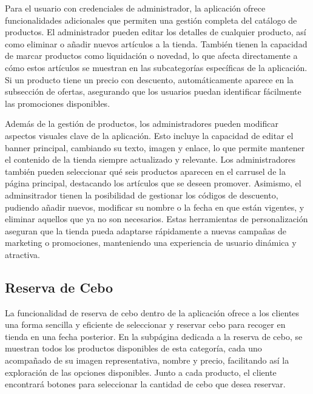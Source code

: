 \vspace{0.5cm}

Para el usuario con credenciales de administrador, la aplicación ofrece funcionalidades adicionales que permiten una gestión completa del catálogo de productos. El administrador pueden editar los detalles de cualquier producto, así como eliminar o añadir nuevos artículos a la tienda. También tienen la capacidad de marcar productos como liquidación o novedad, lo que afecta directamente a cómo estos artículos se muestran en las subcategorías específicas de la aplicación. Si un producto tiene un precio con descuento, automáticamente aparece en la subsección de ofertas, asegurando que los usuarios puedan identificar fácilmente las promociones disponibles.

\vspace{0.5cm}

Además de la gestión de productos, los administradores pueden modificar aspectos visuales clave de la aplicación. Esto incluye la capacidad de editar el banner principal, cambiando su texto, imagen y enlace, lo que permite mantener el contenido de la tienda siempre actualizado y relevante. Los administradores también pueden seleccionar qué seis productos aparecen en el carrusel de la página principal, destacando los artículos que se deseen promover. Asimismo, el adminsitrador tienen la posibilidad de gestionar los códigos de descuento, pudiendo añadir nuevos, modificar su nombre o la fecha en que están vigentes, y eliminar aquellos que ya no son necesarios. Estas herramientas de personalización aseguran que la tienda pueda adaptarse rápidamente a nuevas campañas de marketing o promociones, manteniendo una experiencia de usuario dinámica y atractiva.


\subsection{Reserva de Cebo}\label{subsec5.2.3}

La funcionalidad de reserva de cebo dentro de la aplicación ofrece a los clientes una forma sencilla y eficiente de seleccionar y reservar cebo para recoger en tienda en una fecha posterior. En la subpágina dedicada a la reserva de cebo, se muestran todos los productos disponibles de esta categoría, cada uno acompañado de su imagen representativa, nombre y precio, facilitando así la exploración de las opciones disponibles. Junto a cada producto, el cliente encontrará botones para seleccionar la cantidad de cebo que desea reservar.

